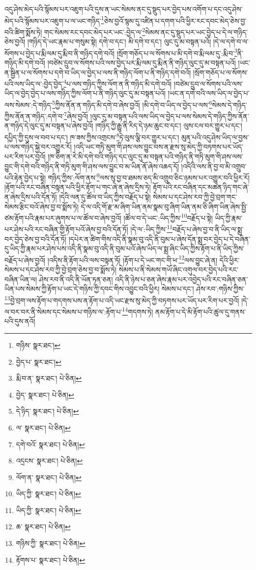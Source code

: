 འདུ་ཤེས་མེད་པའི་སྙོམས་པར་འཇུག་པའི་དུས་ན་ཡང་སེམས་ནང་དུ་སྡུད་པར་བྱེད་པས་འགོག་པ་དང་འདུ་ཤེས་མེད་པའི་སྙོམས་པར་འཇུག་པ་ལ་ཡང་གཉིད་\footnote{གཉིས་  སྣར་ཐང་། }ཅེས་བྱའོ་སྙམ་དུ་འཛིན་པ་དགག་པའི་ཕྱིར་རང་དབང་མེད་ཅེས་བྱ་བའི་ཚིག་སྨོས་ཏེ། གང་སེམས་རང་དབང་མེད་པར་ཡང་:བྱེད་ལ་\footnote{བྱེད་པ་  སྣར་ཐང་། }སེམས་ནང་དུ་སྡུད་པར་ཡང་བྱེད་པ་དེ་ལ་གཉིད་ཅེས་བྱའོ། །གཉིད་དེ་ཡང་རྣམ་པ་གསུམ་སྟེ། དགེ་བ་དང་། མི་དགེ་བ་དང་། ལུང་དུ་མ་བསྟན་པའོ། །དེ་ལ་དགེ་བ་ལ་སོགས་པ་བྱེད་པ་རྨི་ལམ་དུ་རྨི་བ་ནི་གཉིད་དགེ་བའོ། །སྲོག་གཅོད་པ་ལ་སོགས་པ་མི་དགེ་བ་རྨི་ལམ་དུ་:རྨི་བ་\footnote{རྨི་བ་ན་  སྣར་ཐང་།  པེ་ཅིན། }ནི་གཉིད་མི་དགེ་བའོ། །བཙེམ་དྲུབ་ལ་སོགས་པའི་ལས་བྱེད་པར་རྨི་ལམ་དུ་རྨི་ན་ནི་གཉིད་ལུང་དུ་མ་བསྟན་པའོ། །ཡང་ན་སྦྱིན་པ་ལ་སོགས་པ་དགེ་བ་ཡིད་ལ་བྱེད་པ་ལས་ནི་གཉིད་ལོག་པ་ནི་གཉིད་དགེ་བའོ། །སྲོག་གཅོད་པ་ལ་སོགས་པའི་ལས་ཡིད་ལ་:བྱེད་བྱེད་\footnote{བྱེད་  སྣར་ཐང་།  པེ་ཅིན། }པ་ལས་གཉིད་ཀྱིས་ལོག་ན་ནི་གཉིད་མི་དགེ་བའོ། །བཙེམ་དྲུབ་ལ་སོགས་པའི་ལས་ཡིད་ལ་བྱེད་བྱེད་པ་ལས་གཉིད་ཀྱིས་ལོག་པ་ནི་གཉིད་ལུང་དུ་མ་བསྟན་པའོ། །ཡང་ན་དགེ་བའི་ལས་ཡིད་ལ་བྱེད་པ་ལས་སེམས་:དེ་གཉིད་\footnote{དེ་ཉིད་  སྣར་ཐང་།  པེ་ཅིན། }ཀྱིས་ནོན་ན་གཉིད་མི་དགེ་བ་ཞེས་བྱའོ། །མི་དགེ་བ་ཡིད་ལ་བྱེད་པ་ལས་\footnote{ལ་  སྣར་ཐང་།  པེ་ཅིན། }སེམས་དེ་གཉིད་ཀྱིས་ནོན་ན་གཉིད་:དགེ་བ་\footnote{དགེ་བའོ་  སྣར་ཐང་།  པེ་ཅིན། }ཞེས་བྱའོ། །ལུང་དུ་མ་བསྟན་པའི་ལས་ཡིད་ལ་བྱེད་པ་ལས་སེམས་དེ་གཉིད་ཀྱིས་ནོན་ན་གཉིད་དེ་ལུང་དུ་མ་བསྟན་པ་ཞེས་བྱའོ། །གཉིད་ཀྱི་རྒྱུ་ནི་རིད་དེ་ཉམ་ཆུང་བ་དང་། ལུས་ངལ་བར་གྱུར་པ་དང་། དཔྱིད་ཀྱི་དུས་ལ་བབ་པ་དང་། ཁ་ཟས་ཀྱིས་འགྲངས་\footnote{འདྲངས་  སྣར་ཐང་།  པེ་ཅིན། }ཏེ་ལུས་ལྕི་བར་གྱུར་པ་དང་། མུན་པའི་འདུ་ཤེས་ཡིད་ལ་བྱས་པ་ལས་གཉིད་སྐྱེ་བར་འགྱུར་རོ། །འདི་ཡང་གཏི་མུག་གི་ཤས་ལས་བྱུང་བས་ན་རྫས་སུ་མེད་ཀྱི་བཏགས་པར་ཡོད་པར་རིག་པར་བྱའོ། །ཁ་ཅིག་ན་རེ་མི་དགེ་བའི་གཉིད་དང་ལུང་དུ་མ་བསྟན་པའི་གཉིད་ནི་གཏི་མུག་གི་ཤས་ལས་བྱུང་གི་དགེ་བའི་གཉིད་ནི་གཏི་མུག་གི་ཤས་ལས་བྱུང་བ་མ་ཡིན་ནོ་ཞེས་འཆད་དོ། །འདིའི་ལས་ནི་བྱ་བ་མི་འགྲུབ་པའི་རྟེན་བྱེད་པ་སྟེ། གཉིད་ཀྱིས་:ལོག་ནས་\footnote{ལོག་ན་  སྣར་ཐང་།  པེ་ཅིན། }ལས་སུ་བྱ་བ་ཐམས་ཅད་མི་འགྲུབ་ཅིང་ཉམས་པར་འགྱུར་བའི་ཕྱིར་རོ། །རྟོག་པའི་རང་བཞིན་བསྟན་པའི་ཕྱིར་རྟོག་པ་གང་ཞེ་ན་ཞེས་དྲིས་ཏེ། རྟོག་པའི་རང་བཞིན་དང་མཚན་ཉིད་གང་ཞེ་ན་ཞེས་དྲིས་པའི་དོན་ཏོ། །དེའི་ལན་དུ་ཚོལ་བ་ཡིད་ཀྱིས་བརྗོད་པ་སྟེ། སེམས་པ་དང་ཤེས་རབ་ཀྱི་བྱེ་བྲག་གང་སེམས་རྩིང་བའོ་ཞེས་བྱ་བ་སྨོས་ཏེ། དེ་ལ་འདི་གོ་རྫ་མ་ཞིག་ཡིན་ནམ་སྣམ་བུ་ཞིག་ཡིན་ནམ་ཅི་ཞིག་ཡིན་ཞེས་སྤྱི་ཙམ་རྟོག་པའི་རྣམ་པར་ཞུགས་པ་ལ་ཚོལ་བ་ཞེས་བྱའོ། །ཚོལ་བ་དེ་ཡང་:ཡིད་ཀྱིས་\footnote{ཡིད་ཀྱི་  སྣར་ཐང་།  པེ་ཅིན། }བརྗོད་པ་སྟེ། ཡིད་ཀྱི་རྣམ་པར་ཤེས་པའི་རང་བཞིན་གྱི་རྟོག་པའོ་ཞེས་བྱ་བའི་དོན་ཏོ། །དེ་ལ་:ཡིད་ཀྱིས་\footnote{ཡིད་ཀྱི་  སྣར་ཐང་།  པེ་ཅིན། }བརྗོད་པ་ཞེས་བྱ་བ་ནི་ཡིད་ལ་སྨྲ་བར་བྱེད་ཅེས་བྱ་བའི་དོན་ཏོ། །དཔེར་ན་ཚིག་གིས་འདི་ནི་སྣམ་བུ་འདི་ནི་བུམ་པ་ཞེས་དོན་སྨྲ་བར་བྱེད་པ་དེ་བཞིན་དུ་ཡིད་ཀྱི་རྣམ་པར་ཤེས་པས་འདི་ནི་སྣམ་བུ་འདི་ནི་བུམ་པའོ་ཞེས་ཡིད་ལ་སྨྲ་ཞིང་ཡིད་ཀྱིས་རྟོག་པ་ནི་ཡིད་ཀྱིས་བརྗོད་པ་ཞེས་བྱའོ། །འདིས་ནི་རྟོག་པའི་ལས་བསྟན་ཏོ། །རྟོག་པ་དེ་ཡང་གང་གི་ཕ་\footnote{ཆ་  སྣར་ཐང་།  པེ་ཅིན། }ལས་བྱུང་ཞེ་ན། དེའི་ཕྱིར་སེམས་པ་དང་ཤེས་རབ་ཀྱི་བྱེ་བྲག་ཅེས་བྱ་བ་སྨོས་ཏེ། སེམས་པ་ནི་སེམས་གཡོ་ཞིང་འགུལ་བར་བྱེད་པའི་རང་བཞིན་ཡིན་ལ། ཤེས་རབ་ནི་འདི་ནི་ཡོན་ཏན་ཅན། འདི་ནི་ཉེས་པ་ཅན་ཞེས་རྣམ་པར་འབྱེད་པའི་རང་བཞིན་ཅན་ཡིན་པས་སེམས་ཀྱི་རྟོག་པ་ཡང་དེ་གཉིས་ཀྱི་དབང་གིས་འབྱུང་བའི་ཕྱིར། སེམས་པ་དང་། ཤེས་རབ་:གཉིས་ཀྱིས་\footnote{གཉིས་ཀྱི་  སྣར་ཐང་།  པེ་ཅིན། }བྱེ་བྲག་ལས་རྟོག་པ་གདགས་པས་ན་རྟོག་པ་འདི་ཡང་རྫས་སུ་མེད་ཀྱི་བཏགས་པར་ཡོད་པར་རིག་པར་བྱའོ། །དེ་ལ་བར་བར་ནི་སེམས་དང་སེམས་པ་གཉིས་ལ་:རྟོག་པ་\footnote{རྟོགས་པ་  སྣར་ཐང་།  པེ་ཅིན། }གདགས་ཏེ། ནམ་རྟོག་པ་དེ་མི་རྟོག་པའི་ཚུལ་དུ་གནས་པའི་དུས་ནའོ། 
